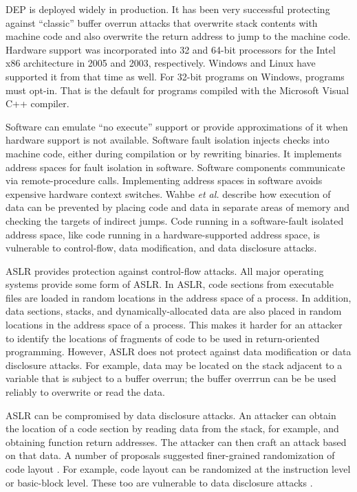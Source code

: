 DEP is deployed widely in production.  It has been very
successful protecting against ``classic'' buffer overrun attacks that overwrite 
stack contents with machine code and also overwrite the return address to jump to 
the machine code.
Hardware support was incorporated into 32 and 64-bit processors
for the Intel x86 architecture in 2005 and 2003, respectively.  Windows
and Linux have supported it from that time as well.  For 32-bit programs on
Windows, programs must opt-in.  That is the default for programs compiled
with the Microsoft Visual C++ compiler.

Software can emulate ``no execute'' support or provide approximations of it
when hardware support is not available. Software fault isolation
\cite{Castro2009, Erlingsson2006,McCamant2006,Wahbe1993,Yee2009} injects checks
into machine code, either during compilation or by rewriting binaries.
It implements address spaces for fault isolation in software. Software components communicate via remote-procedure calls. Implementing address
spaces in software avoids expensive hardware context switches.
Wahbe {\it et al.} \cite{Wahbe1993} describe how execution of data can be
prevented by placing code and data in separate areas of memory and checking the
targets of  indirect jumps.  Code running in a software-fault isolated address
space, like code running in a hardware-supported address space, is vulnerable to 
control-flow, data modification,  and data disclosure attacks.

ASLR \cite{PaX2003,WikipediaASLR} provides protection against 
control-flow attacks.   All major operating systems provide
some form of ASLR. In ASLR, code
sections from executable files are loaded in random locations in the
address space of a process.  In addition, data sections, stacks, and
dynamically-allocated data are also placed in random locations in the address
space of a process. This makes it harder for an attacker to identify the locations of fragments of code to be used in return-oriented programming.  However, ASLR does
not protect against data modification or data disclosure attacks. For example, data 
may be located on the stack adjacent to a
variable that is subject to a buffer overrun; the buffer overrrun can be
be used reliably to overwrite or read the data.   

ASLR can be compromised by data disclosure attacks.  An attacker can obtain the
location of a code section by reading data from the stack, for example, and obtaining function return addresses.  The attacker can then craft an attack based on that data. 
A number of proposals suggested finer-grained  randomization of code layout
\cite{Bhatkar2005, Hiser2012, Kil2006, Pappas2012,Wartell2012}.
For example, code layout can be randomized at the instruction level or
basic-block level. These too are vulnerable to 
data disclosure attacks \cite{Snow2013}.

